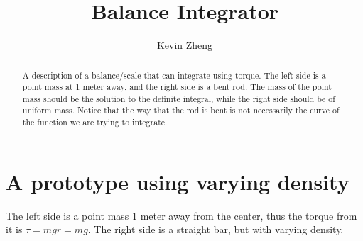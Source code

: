 \documentclass[letterpaper, 12pt]{article}
\title{Balance Integrator}
\author{Kevin Zheng}
\begin{document}
\maketitle
\begin{abstract}
    \par A description of a balance/scale that can integrate using torque.
    The left side is a point mass at 1 meter away, and the right side is a bent rod.
    The mass of the point mass should be the solution to the definite integral, while the right side should be of uniform mass.
    Notice that the way that the rod is bent is not necessarily the curve of the function we are trying to integrate.
\end{abstract}
\tableofcontents
\section{A prototype using varying density}
\par The left side is a point mass 1 meter away from the center, thus the torque from it is $\tau = mgr = mg$.
The right side is a straight bar, but with varying density.
\begin{center}
\end{center}
\end{document}
